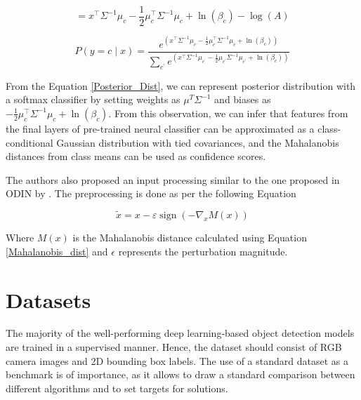     $$ =x^{\top} \Sigma^{-1} \mu_{c}-\frac{1}{2} \mu_{c}^{\top} \Sigma^{-1} \mu_{c}+\ln \left(\beta_{c}\right)-\log (A)$$
    
    \begin{equation}
    P(y=c \mid x)=\frac{e^{\left(x^{\top} \Sigma^{-1} \mu_{c}-\frac{1}{2} \mu_{c}^{\top} \Sigma^{-1} \mu_{c}+\ln \left(\beta_{c}\right)\right)}}{\sum_{c^{\prime}} e^{\left(x^{\top} \Sigma^{-1} \mu_{c^{\prime}}-\frac{1}{2} \mu_{c^{\prime}} \Sigma^{-1} \mu_{c^{\prime}}+\ln \left(\beta_{c}\right)\right)}}
    \label{Posterior_Dist}
    \end{equation}
    
    From the Equation \ref{Posterior_Dist}, we can represent posterior distribution with a softmax classifier by setting weights as $\mu^{T}\Sigma^{-1}$ and biases as $-\frac{1}{2} \mu_{c}^{\top} \Sigma^{-1} \mu_{c} + \ln (\beta_{c})$. From this observation, we can infer that features from the final layers of pre-trained neural classifier can be approximated as a class-conditional Gaussian distribution with tied covariances, and the Mahalanobis distances from class means can be used as confidence scores.
    
    The authors also proposed an input processing similar to the one proposed in ODIN by \cite{Liang2017}. The preprocessing is done as per the following Equation 
    
    \begin{equation}
        \tilde{x}=x-\varepsilon \operatorname{sign}\left(-\nabla_{x} M(x)\right)
        \label{perturbation}
    \end{equation}
    
    Where $M(x)$ is the Mahalanobis distance calculated using Equation \ref{Mahalanobis_dist} and $\epsilon$ represents the perturbation magnitude. 
    
    \section{Datasets}
    The majority of the well-performing deep learning-based object detection models are trained in a supervised manner. Hence, the dataset should consist of RGB camera images and 2D bounding box labels. The use of a standard dataset as a benchmark is of importance, as it allows to draw a standard comparison between different algorithms and to set targets for solutions. 
    
